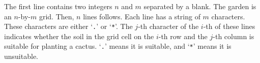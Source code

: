 The first line contains two integers $n$ and $m$ separated by a blank.
The garden is an $n$-by-$m$ grid.
Then, $n$ lines follows. Each line has a string of $m$ characters.
These characters are either `\verb+.+' or `\verb+*+'.
The $j$-th character of the $i$-th of these lines indicates whether
the soil in the grid cell on the $i$-th row and the $j$-th column is 
suitable for planting a cactus. 
`\verb+.+' means it is suitable, and `\verb+*+' means it is unsuitable.
